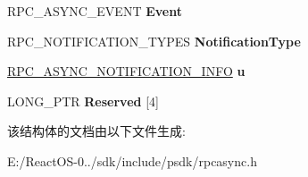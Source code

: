 \begin{DoxyCompactItemize}
\mbox{\label{struct___r_p_c___a_s_y_n_c___s_t_a_t_e_aae47ea485d6369348da12d1508486583}} 
R\+P\+C\+\_\+\+A\+S\+Y\+N\+C\+\_\+\+E\+V\+E\+NT {\bfseries Event}
\item 
\mbox{\label{struct___r_p_c___a_s_y_n_c___s_t_a_t_e_a938514dcc99f247cb83d36196748ab12}} 
R\+P\+C\+\_\+\+N\+O\+T\+I\+F\+I\+C\+A\+T\+I\+O\+N\+\_\+\+T\+Y\+P\+ES {\bfseries Notification\+Type}
\item 
\mbox{\label{struct___r_p_c___a_s_y_n_c___s_t_a_t_e_a4f5bf25973484142e1da0eaed1735bc0}} 
\hyperlink{union___r_p_c___a_s_y_n_c___n_o_t_i_f_i_c_a_t_i_o_n___i_n_f_o}{R\+P\+C\+\_\+\+A\+S\+Y\+N\+C\+\_\+\+N\+O\+T\+I\+F\+I\+C\+A\+T\+I\+O\+N\+\_\+\+I\+N\+FO} {\bfseries u}
\item 
\mbox{\label{struct___r_p_c___a_s_y_n_c___s_t_a_t_e_aa51c0c65257e5121a477542fc6eff5fb}} 
L\+O\+N\+G\+\_\+\+P\+TR {\bfseries Reserved} \mbox{[}4\mbox{]}
\end{DoxyCompactItemize}


该结构体的文档由以下文件生成\+:\begin{DoxyCompactItemize}
\item 
E\+:/\+React\+O\+S-\/0../sdk/include/psdk/rpcasync.\+h\end{DoxyCompactItemize}
